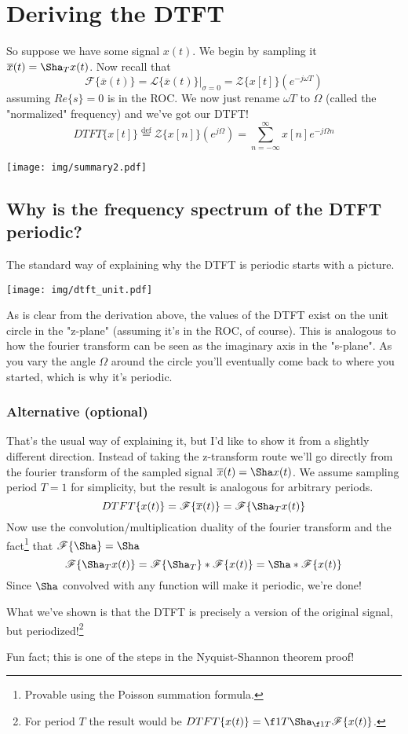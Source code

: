 \documentclass{article}
\newcommand{\0}{{\mathbf{0}}}
\newcommand{\texteq}[1]{\ensuremath{\stackrel{\text{#1}}{=}}}
\begin{document}
\section{Deriving the DTFT}
So suppose we have some signal $x(t)$.
We begin by sampling it $\overline{x}(t) = \Sha_T x(t)$.
Now recall that
$$ \mathscr{F}\{ \overline{x}(t) \} = \mathscr{L}\{ \overline{x}(t) \}\Big|_{\sigma = 0} = \mathscr{Z}\{ x[t] \}(e^{-j\omega T}) $$
assuming $Re\{ s\} = 0$ is in the ROC.
We now just rename $\omega T$ to $\Omega$ (called the "normalized" frequency) and we've got our DTFT!
$$ DTFT\{ x[t] \} \texteq{def} \mathscr{Z}\{ x[n] \}(e^{j\Omega}) = \sum^{\infty}_{n=-\infty} x[n]e^{-j\Omega n} $$

\begin{center}
  \texttt{[image: img/summary2.pdf]}
\end{center}

\subsection{Why is the frequency spectrum of the DTFT periodic?}
The standard way of explaining why the DTFT is periodic starts with a picture.

\begin{center}
  \texttt{[image: img/dtft\_unit.pdf]}
\end{center}

As is clear from the derivation above, the values of the DTFT exist on the unit circle in
the "z-plane" (assuming it's in the ROC, of course). This is analogous to how the fourier transform can be seen as the imaginary axis in
the "s-plane". As you vary the angle $\Omega$ around the circle you'll eventually come back to where you started,
which is why it's periodic.

\subsubsection{Alternative (optional)}
That's the usual way of explaining it, but I'd like to show it from a slightly different direction.
Instead of taking the z-transform route we'll go directly from the fourier transform of the sampled signal $\overline{x}(t) = \Sha x(t)$.
We assume sampling period $T=1$ for simplicity, but the result is analogous for arbitrary periods.
$$ DTFT\{ x(t) \} = \mathscr{F}\{ \overline{x}(t) \} = \mathscr{F}\{ \Sha_T x(t) \} $$
Now use the convolution/multiplication duality of the fourier transform and the fact\footnote{Provable using the Poisson summation formula.} that $\mathscr{F}\{ \Sha \} = \Sha$
$$ \mathscr{F}\{ \Sha_T x(t) \} = \mathscr{F}\{ \Sha_T \} * \mathscr{F}\{ x(t) \} = \Sha * \mathscr{F}\{ x(t) \} $$
Since $\Sha$ convolved with any function will make it periodic, we're done!

What we've shown is that the DTFT is precisely a version of the original signal, but periodized!\footnote{For
  period $T$ the result would be $DTFT\{ x(t) \} = \f 1T \Sha_{\f 1T} \mathscr{F}\{ x(t) \}$.}

Fun fact; this is one of the steps in the Nyquist-Shannon theorem proof!
\end{document}
